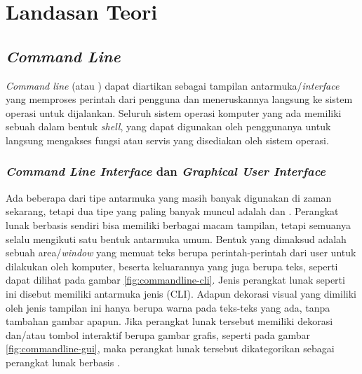 \chapter{Landasan Teori}
\label{chap:teori}


\section{\textit{Command Line}}
\label{sec:commandline}
\textit{Command line} (atau \cli) dapat diartikan sebagai tampilan antarmuka/\textit{interface} yang memproses perintah dari pengguna dan meneruskannya langsung ke sistem operasi untuk dijalankan.\cite{shottsjr:2019:linuxcommandline} Seluruh sistem operasi komputer yang ada memiliki sebuah \cli dalam bentuk \textit{shell}, yang dapat digunakan oleh penggunanya untuk langsung mengakses fungsi atau servis yang disediakan oleh sistem operasi.\cite{mueller:2007:windowscommandline} 


\subsection{\textit{Command Line Interface} dan \textit{Graphical User Interface}}
\label{sec:commandline-comparison}

Ada beberapa dari tipe antarmuka yang masih banyak digunakan di zaman sekarang, tetapi dua tipe yang paling banyak muncul adalah \cli dan \gui. Perangkat lunak berbasis \cl sendiri bisa memiliki berbagai macam tampilan, tetapi semuanya selalu mengikuti satu bentuk antarmuka umum. Bentuk yang dimaksud adalah sebuah area/\textit{window} yang memuat teks berupa perintah-perintah dari user untuk dilakukan oleh komputer, beserta keluarannya yang juga berupa teks, seperti dapat dilihat pada gambar \ref{fig:commandline-cli}. Jenis perangkat lunak seperti ini disebut memiliki antarmuka jenis \cli (CLI). Adapun dekorasi visual yang dimiliki oleh jenis tampilan ini hanya berupa warna pada teks-teks yang ada, tanpa tambahan gambar apapun. Jika perangkat lunak tersebut memiliki dekorasi dan/atau tombol interaktif berupa gambar grafis, seperti pada gambar \ref{fig:commandline-gui}, maka perangkat lunak tersebut dikategorikan sebagai perangkat lunak berbasis \gui.

